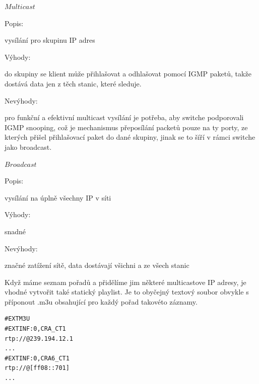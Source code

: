\begin{bf}$Multicast$\end{bf}


\begin{bf}Popis:\end{bf} vysílání pro skupinu IP adres


\begin{bf}Výhody:\end{bf} do skupiny se klient může přihlašovat a odhlašovat pomocí IGMP paketů, takže dostává data jen z těch stanic, které sleduje.


\begin{bf}Nevýhody:\end{bf} pro funkční a efektivní multicast vysílání je potřeba, aby switche podporovali IGMP snooping, což je mechanismus přeposílání packetů pouze na ty porty, ze kterých přišel přihlašovací paket do dané skupiny, jinak se to šíří v rámci switche jako broadcast.

\vspace{10pt}

\begin{bf}$Broadcast$\end{bf}
   

\begin{bf}Popis:\end{bf} vysílání na úplně všechny IP v síti
 

\begin{bf}Výhody:\end{bf} snadné


\begin{bf}Nevýhody:\end{bf} značné zatížení sítě, data dostávají všichni a ze všech stanic

\vspace{10pt}

Když máme seznam pořadů a přidělíme jim některé multicastove IP adresy, je vhodné vytvořit také statický playlist. Je to obyčejný textový soubor obvykle s příponout .m3u obsahující pro každý pořad takovéto záznamy.

\vspace{10pt}

\begin{small}
\begin{verbatim}
#EXTM3U
#EXTINF:0,CRA_CT1
rtp://@239.194.12.1
...
#EXTINF:0,CRA6_CT1
rtp://@[ff08::701]
...
\end{verbatim}
\end{small}

